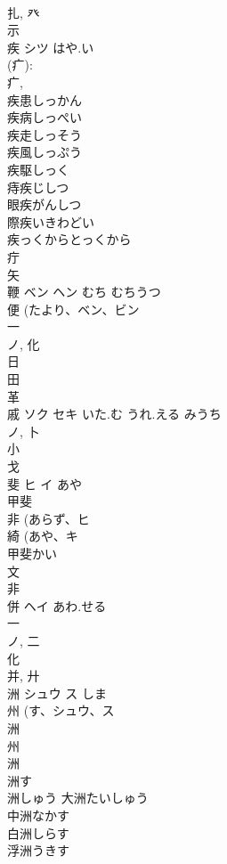 \documentclass[8pt]{extreport}
\begin{document}
\begin{CJK}{UTF8}{min}
\\	扎, 癶 
\\	示 
\\	疾	シツ	はや.い	
\\	(疒): 
\\	疒, 
\\	疾患しっかん
\\	疾病しっぺい
\\	疾走しっそう
\\	疾風しっぷう
\\	疾駆しっく
\\	痔疾じしつ
\\	眼疾がんしつ
\\	際疾いきわどい
\\	疾っくからとっくから
\\	疔 
\\	矢 
\\	鞭	ベン ヘン	むち むちうつ	
\\	便 (たより、ベン、ビン 
\\	一 
\\	ノ, 化 
\\	日 
\\	田 
\\	革 
\\	戚	ソク セキ	いた.む うれ.える みうち	
\\	ノ, 卜 
\\	小 
\\	戈 
\\	斐	ヒ イ	あや	
\\	甲斐 
\\	非 (あらず、ヒ 
\\	綺 (あや、キ 
\\	甲斐かい
\\	文 
\\	非 
\\	併	ヘイ	あわ.せる	
\\	一 
\\	ノ, 二 
\\	化 
\\	并, 廾 
\\	洲	シュウ ス	しま	
\\	州 (す、シュウ、ス 
\\	洲 
\\	州 
\\	洲 
\\	洲す 
\\	洲しゅう 大洲たいしゅう 
\\	中洲なかす 
\\	白洲しらす 
\\	浮洲うきす 

\end{CJK}
\end{document}
